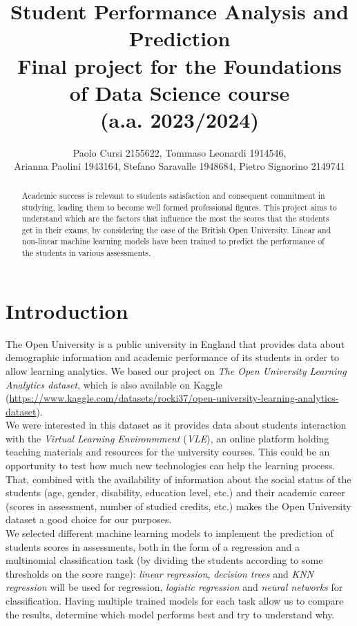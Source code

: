 \documentclass{article}
\title{Student Performance Analysis and Prediction \\ Final project for the Foundations of Data Science course \\(a.a. 2023/2024) }
\author{Paolo Cursi 2155622, Tommaso Leonardi 1914546, \\Arianna Paolini 1943164, Stefano Saravalle 1948684, Pietro Signorino 2149741}
\begin{document}
\maketitle

\begin{abstract}
Academic success is relevant to students satisfaction and consequent commitment in studying, leading them to become well formed professional figures. This project aims to understand which are the factors that influence the most the scores that the students get in their exams, by considering the case of the British Open University. Linear and non-linear machine learning models have been trained to predict the performance of the students in various assessments.
\end{abstract}

\section{Introduction}
The Open University is a public university in England that provides data about demographic information and academic performance of its students in order to allow learning analytics. We based our project on \textit{The Open University Learning Analytics dataset}, which is also available on Kaggle (\url{https://www.kaggle.com/datasets/rocki37/open-university-learning-analytics-dataset}). \\

We were interested in this dataset as it provides data about students interaction with the \textit{Virtual Learning Environmment} (\textit{VLE}), an online platform holding teaching materials and resources for the university courses. This could be an opportunity to test how much new technologies can help the learning process. That, combined with the availability of information about the social status of the students (age, gender, disability, education level, etc.) and their academic career (scores in assessment, number of studied credits, etc.) makes the Open University dataset a good choice for our purposes. \\

We selected different machine learning models to implement the prediction of students scores in assessments, both in the form of a regression and a multinomial classification task (by dividing the students according to some thresholds on the score range): \textit{linear regression}, \textit{decision trees} and \textit{KNN regression} will be used for regression, \textit{logistic regression }and \textit{neural networks} for classification. Having multiple trained models for each task allow us to compare the results, determine which model performs best and try to understand why.
\end{document}
